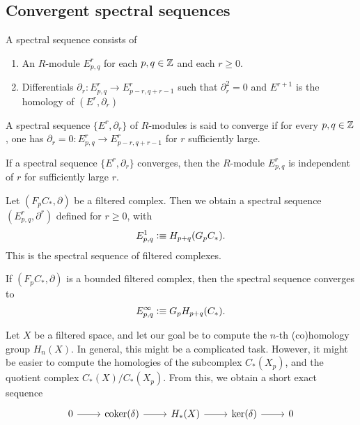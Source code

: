 \documentclass{article}
\begin{document}
\subsection{Convergent spectral sequences}

\begin{defn}
A spectral sequence consists of
\begin{enumerate}
\item An $R$-module $E^r_{p,q}$ for each $p,q\in\mathbb{Z}$ and each $r\geq 0$.
\item Differentials $\partial_r:E^r_{p,q}\to E^r_{p-r,q+r-1}$ such that
$\partial_r^2=0$ and $E^{r+1}$ is the homology of $(E^r,\partial_r)$ 
\end{enumerate}
\end{defn}

\begin{defn}
A spectral sequence $\{E^r,\partial_r\}$ of $R$-modules is said to converge 
if for every $p,q\in\mathbb{Z}$, one has $\partial_r=0:E^r_{p,q}\to E^r_{p-r,q+r-1}$
for $r$ sufficiently large.
\end{defn}

\begin{rmk}
If a spectral sequence $\{E^r,\partial_r\}$ converges, then the $R$-module
$E^r_{p,q}$ is independent of $r$ for sufficiently large $r$. 
\end{rmk}

\begin{thm}
Let $(F_pC_\ast,\partial)$ be a filtered complex. Then we obtain a spectral
sequence $(E^r_{p,q},\partial^r)$ defined for $r\geq 0$, with
\begin{equation*}
E^1_{p,q}\vcentcolon\equiv H_{p+q}(G_pC_\ast).
\end{equation*}
This is the spectral sequence of filtered complexes.
\end{thm}

\begin{thm}
If $(F_pC_\ast,\partial)$ is a bounded filtered complex, then the spectral
sequence converges to
\begin{equation*}
E^\infty_{p,q}\vcentcolon\equiv G_pH_{p+q}(C_\ast).
\end{equation*}
\end{thm}

Let $X$ be a filtered space, and let our goal be to compute the $n$-th (co)homology
group $H_n(X)$. In general, this might be a complicated task. However, it might
be easier to compute the homologies of the subcomplex $C_\ast(X_p)$, and the quotient
complex $C_\ast(X)/C_\ast(X_p)$. From this, we obtain a short exact sequence
\begin{equation*}
\begin{tikzcd}
0 \arrow[r]
& \mathrm{coker}(\delta) \arrow[r]
& H_\ast(X) \arrow[r]
& \mathrm{ker}(\delta) \arrow[r]
& 0
\end{tikzcd}
\end{equation*}
\end{document}
